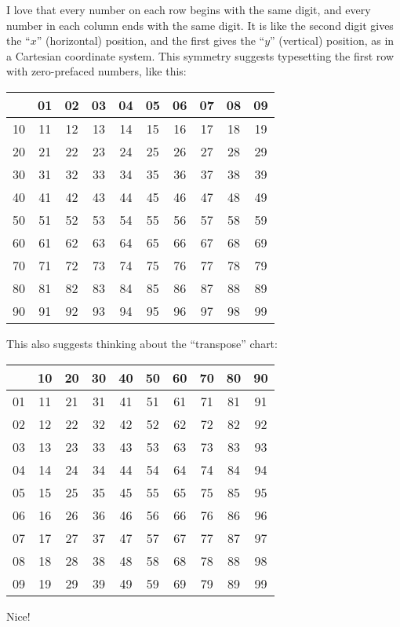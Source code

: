 \documentclass[12pt]{article}
\newcommand{\tablesize}{\footnotesize\sffamily}
\begin{document}
I love that every number on each row begins with the same digit, and
every number in each column ends with the same digit.  It is like the
second digit gives the ``$x$'' (horizontal) position, and the first
gives the ``$y$'' (vertical) position, as in a Cartesian coordinate
system.  This symmetry suggests typesetting the first row with
zero-prefaced numbers, like this:
\begin{center}\tablesize
\begin{tabular}{|c|c|c|c|c|c|c|c|c|c|}
\hline
    & 01 & 02 & 03 & 04 & 05 & 06 & 07 & 08 & 09 \\ \hline
 10 & 11 & 12 & 13 & 14 & 15 & 16 & 17 & 18 & 19 \\ \hline
 20 & 21 & 22 & 23 & 24 & 25 & 26 & 27 & 28 & 29 \\ \hline
 30 & 31 & 32 & 33 & 34 & 35 & 36 & 37 & 38 & 39 \\ \hline
 40 & 41 & 42 & 43 & 44 & 45 & 46 & 47 & 48 & 49 \\ \hline
 50 & 51 & 52 & 53 & 54 & 55 & 56 & 57 & 58 & 59 \\ \hline
 60 & 61 & 62 & 63 & 64 & 65 & 66 & 67 & 68 & 69 \\ \hline
 70 & 71 & 72 & 73 & 74 & 75 & 76 & 77 & 78 & 79 \\ \hline
 80 & 81 & 82 & 83 & 84 & 85 & 86 & 87 & 88 & 89 \\ \hline
 90 & 91 & 92 & 93 & 94 & 95 & 96 & 97 & 98 & 99 \\ \hline
\end{tabular}
\end{center}
This also suggests thinking about the ``transpose'' chart:
\begin{center}\tablesize
\begin{tabular}{|c|c|c|c|c|c|c|c|c|c|}
\hline
    & 10 & 20 & 30 & 40 & 50 & 60 & 70 & 80 & 90 \\ \hline
 01 & 11 & 21 & 31 & 41 & 51 & 61 & 71 & 81 & 91 \\ \hline
 02 & 12 & 22 & 32 & 42 & 52 & 62 & 72 & 82 & 92 \\ \hline
 03 & 13 & 23 & 33 & 43 & 53 & 63 & 73 & 83 & 93 \\ \hline
 04 & 14 & 24 & 34 & 44 & 54 & 64 & 74 & 84 & 94 \\ \hline
 05 & 15 & 25 & 35 & 45 & 55 & 65 & 75 & 85 & 95 \\ \hline
 06 & 16 & 26 & 36 & 46 & 56 & 66 & 76 & 86 & 96 \\ \hline
 07 & 17 & 27 & 37 & 47 & 57 & 67 & 77 & 87 & 97 \\ \hline
 08 & 18 & 28 & 38 & 48 & 58 & 68 & 78 & 88 & 98 \\ \hline
 09 & 19 & 29 & 39 & 49 & 59 & 69 & 79 & 89 & 99 \\ \hline
\end{tabular}
\end{center}
Nice!
\end{document}
